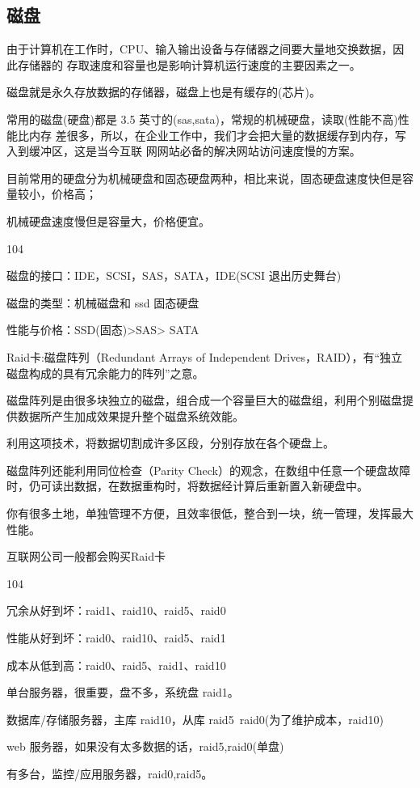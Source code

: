 \subsection{磁盘}
由于计算机在工作时，CPU、输入输出设备与存储器之间要大量地交换数据，因此存储器的 存取速度和容量也是影响计算机运行速度的主要因素之一。


磁盘就是永久存放数据的存储器，磁盘上也是有缓存的(芯片)。

常用的磁盘(硬盘)都是 3.5 英寸的(sas,sata)，常规的机械硬盘，读取(性能不高)性能比内存 差很多，所以，在企业工作中，我们才会把大量的数据缓存到内存，写入到缓冲区，这是当今互联 网网站必备的解决网站访问速度慢的方案。

目前常用的硬盘分为机械硬盘和固态硬盘两种，相比来说，固态硬盘速度快但是容量较小，价格高；

机械硬盘速度慢但是容量大，价格便宜。

\begin{dinglist}{104}
\item 磁盘的接口：IDE，SCSI，SAS，SATA，IDE(SCSI 退出历史舞台)

\item 磁盘的类型：机械磁盘和 ssd 固态硬盘

\item 性能与价格：SSD(固态)>SAS> SATA
\end{dinglist}

Raid卡:磁盘阵列（Redundant Arrays of Independent Drives，RAID），有“独立磁盘构成的具有冗余能力的阵列”之意。

磁盘阵列是由很多块独立的磁盘，组合成一个容量巨大的磁盘组，利用个别磁盘提供数据所产生加成效果提升整个磁盘系统效能。

利用这项技术，将数据切割成许多区段，分别存放在各个硬盘上。

磁盘阵列还能利用同位检查（Parity Check）的观念，在数组中任意一个硬盘故障时，仍可读出数据，在数据重构时，将数据经计算后重新置入新硬盘中。

你有很多土地，单独管理不方便，且效率很低，整合到一块，统一管理，发挥最大性能。

互联网公司一般都会购买Raid卡

\begin{dinglist}{104}
\item 冗余从好到坏：raid1、raid10、raid5、raid0

\item 性能从好到坏：raid0、raid10、raid5、raid1

\item 成本从低到高：raid0、raid5、raid1、raid10

\item 单台服务器，很重要，盘不多，系统盘 raid1。
\item 数据库/存储服务器，主库 raid10，从库 raid5\ raid0(为了维护成本，raid10)
\item web 服务器，如果没有太多数据的话，raid5,raid0(单盘)
\item 有多台，监控/应用服务器，raid0,raid5。
\end{dinglist}

